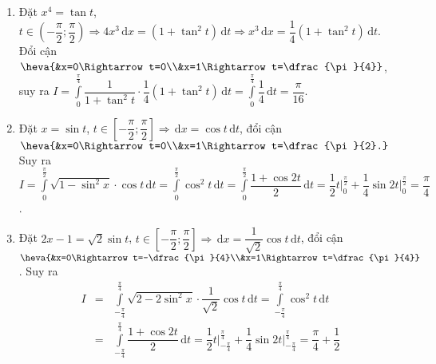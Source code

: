\begin{ex}
{\begin{enumerate}
			Đổi cận $\heva{&x=0\Rightarrow t=\dfrac{\pi}{6}\\&x=1\Rightarrow t=\dfrac{\pi}{3}}$, nên
			$I=\displaystyle\int\limits_{\tfrac{\pi}{6}}^{\tfrac{\pi}{3}}\dfrac{1}{3+3\tan^2t}\cdot\dfrac{\sqrt{3}}{2}\left(1+\tan^2t\right)\mathrm{\,d}t=\displaystyle\int\limits_{\tfrac{\pi}{6}}^{\tfrac{\pi}{3}}\dfrac{1}{2\sqrt{3}}\mathrm{\,d}t=\dfrac{\pi}{12\sqrt{3}}$.
			\item Đặt $x^4=\tan t$, $t\in\left(-\dfrac{\pi}{2};\dfrac{\pi}{2}\right)\Rightarrow 4x^3\mathrm{\,d}x=\left(1+\tan^2t\right)\mathrm{\,d}t\Rightarrow x^3\mathrm{\,d}x=\dfrac{1}{4}\left(1+\tan^2t\right)\mathrm{\,d}t$.\\
			Đổi cận $\heva{&x=0\Rightarrow t=0\\&x=1\Rightarrow t=\dfrac{\pi}{4}}$, suy ra
			$I=\displaystyle\int\limits_0^{\tfrac{\pi}{4}}\dfrac{1}{1+\tan^2t}\cdot\dfrac{1}{4}\left(1+\tan^2t\right)\mathrm{\,d}t=\displaystyle\int\limits_0^{\tfrac{\pi}{4}}\dfrac{1}{4}\mathrm{\,d}t=\dfrac{\pi}{16}$.
			\item Đặt $x=\sin t$, $t\in\left[-\dfrac{\pi}{2};\dfrac{\pi}{2}\right]\Rightarrow\mathrm{\,d}x=\cos t\mathrm{\,d}t$, đổi cận $\heva{&x=0\Rightarrow t=0\\&x=1\Rightarrow t=\dfrac{\pi}{2}.}$\\
			Suy ra $I=\displaystyle\int\limits_0^{\tfrac{\pi}{2}}\sqrt{1-\sin^2x}\cdot \cos t\mathrm{\,d}t=\displaystyle\int\limits_0^{\tfrac{\pi}{2}} \cos^2t\mathrm{\,d}t=\displaystyle\int\limits_0^{\tfrac{\pi}{2}}\dfrac{1+\cos 2t}{2}\mathrm{\,d}t=\dfrac{1}{2}t\bigg|_0^{\tfrac{\pi}{2}}+\dfrac{1}{4}\sin 2t\bigg|_0^{\tfrac{\pi}{2}}=\dfrac{\pi}{4}$.
			\item Đặt $2x-1=\sqrt{2}\sin t$, $t\in\left[-\dfrac{\pi}{2};\dfrac{\pi}{2}\right]\Rightarrow\mathrm{\,d}x=\dfrac{1}{\sqrt{2}}\cos t\mathrm{\,d}t$, đổi cận $\heva{&x=0\Rightarrow t=-\dfrac{\pi}{4}\\&x=1\Rightarrow t=\dfrac{\pi}{4}}$. Suy ra
			\allowdisplaybreaks
			\begin{eqnarray*}
				I & = & \displaystyle\int\limits_{-\tfrac{\pi}{4}}^{\tfrac{\pi}{4}}\sqrt{2-2\sin^2x}\cdot\dfrac{1}{\sqrt{2}}\cos t\mathrm{\,d}t=\displaystyle\int\limits_{-\tfrac{\pi}{4}}^{\tfrac{\pi}{4}} \cos^2t\mathrm{\,d}t\\
				& = & \displaystyle\int\limits_{-\tfrac{\pi}{4}}^{\tfrac{\pi}{4}}\dfrac{1+\cos 2t}{2}\mathrm{\,d}t=\dfrac{1}{2}t\bigg|_{-\tfrac{\pi}{4}}^{\tfrac{\pi}{4}}+\dfrac{1}{4}\sin 2t\bigg|_{-\tfrac{\pi}{4}}^{\tfrac{\pi}{4}}=\dfrac{\pi}{4}+\dfrac{1}{2}
			\end{eqnarray*}

\end{enumerate}}
\end{ex}
